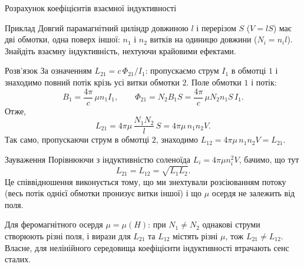\documentclass[onlytextwidth]{beamer}
\begin{document}
\begin{frame}{Розрахунок коефіцієнтів взаємної індуктивності}{}\small
	\begin{exampleblock}{Приклад}\justifying
		Довгий парамагнітний циліндр довжиною $l$ і перерізом $S$ ($V = lS$) має дві обмотки, одна поверх іншої: $n_1$ і $n_2$ витків на
		одиницю довжини ($N_i = n_i l$). Знайдіть взаємну індуктивність, нехтуючи крайовими ефектами.
	\end{exampleblock}

	\begin{overprint}
		\begin{block}{Розв'язок}\justifying
			За означенням $L_{21} = c\,\Phi_{21}/I_1$: пропускаємо струм $I_1$ в обмотці $1$ і знаходимо повний потік крізь усі витки обмотки
			$2$. Поле обмотки $1$ і потік:
			\begin{equation*}
				B_1 = \frac{4\pi}{c}\,\mu n_1 I_1,
				\qquad
				\Phi_{21} = N_2 B_1 S = \frac{4\pi}{c}\,\mu N_2 n_1 S\, I_1.
			\end{equation*}
			Отже,
			\begin{equation*}
				L_{21} = 4\pi\mu\,\frac{N_1 N_2}{l}\,S = 4\pi\mu\, n_1 n_2 V.
			\end{equation*}
			Так само, пропускаючи струм в обмотці $2$, знаходимо $L_{12} = 4\pi\mu\, n_1 n_2 V = L_{21}$.
		\end{block}
		\begin{block}{Зауваження}\justifying
			Порівнюючи з індуктивністю соленоїда $L_i = 4\pi\mu n_i^2 V$, бачимо, що тут
			\begin{equation*}
				L_{21} = L_{12} = \sqrt{L_1L_2}.
			\end{equation*}
			Це співвідношення виконується тому, що ми знехтували розсіюванням потоку (весь потік однієї обмотки пронизує витки іншої) і що $\mu$
			осердя не залежить від поля.

			\smallskip

			Для феромагнітного осердя $\mu = \mu(H)$: при $N_1 \neq N_2$ однакові струми створюють різні поля, і вирази для $L_{21}$ та $L_{12}$
			містять різні $\mu$, тож $L_{21} \neq L_{12}$. Власне, для нелінійного середовища коефіцієнти індуктивності втрачають сенс сталих.
		\end{block}
	\end{overprint}
\end{frame}
\end{document}

